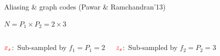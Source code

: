 \documentclass[10pt,xcolor=table]{beamer}
\begin{document}
	\begin{frame}{Aliasing \& graph codes (Pawar \& Ramchandran'13)}
	
		\begin{block}{}
			\begin{figure}[t]
				\begin{center}
					\resizebox{1.0\textwidth}{!}{}
				\end{center}
			\end{figure}
        $N = P_1 \times P_2 = 2 \times 3$
		\end{block}
		\pause
		\begin{columns}
			
			\column{.47\textwidth}
			\begin{block}{{\small $\color{red}x_s$:\ Sub-sampled by $f_1=P_1=2$}}
					\begin{figure}[t]
					\begin{center}
						\resizebox{1.0\textwidth}{!}{}
					\end{center}
				\end{figure}
			\end{block}
			\pause
			\begin{block}{{\small$\color{red}z_s$:\ Sub-sampled by $f_2=P_2=3$}}
				

\end{block}
\end{columns}
\end{frame}
\end{document}
